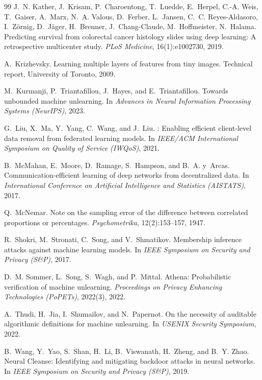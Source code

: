 \documentclass[11pt]{article}
\begin{document}
\begin{thebibliography}{99}
J.~N. Kather, J.~Krisam, P.~Charoentong, T.~Luedde, E.~Herpel, C.-A. Weis,
T.~Gaiser, A.~Marx, N.~A. Valous, D.~Ferber, L.~Jansen, C.~C. Reyes-Aldasoro,
I.~Z\"ornig, D.~J\"ager, H.~Brenner, J.~Chang-Claude, M.~Hoffmeister,
N.~Halama.
\newblock Predicting survival from colorectal cancer histology slides using
deep learning: A retrospective multicenter study.
\newblock \emph{PLoS Medicine}, 16(1):e1002730, 2019.

A.~Krizhevsky.
\newblock Learning multiple layers of features from tiny images.
\newblock Technical report, University of Toronto, 2009.

M.~Kurmanji, P.~Triantafillou, J.~Hayes, and E.~Triantafillou.
\newblock Towards unbounded machine unlearning.
\newblock In \emph{Advances in Neural Information Processing Systems
(NeurIPS)}, 2023.

G.~Liu, X.~Ma, Y.~Yang, C.~Wang, and J.~Liu.
: Enabling efficient client-level data removal from
federated learning models.
\newblock In \emph{IEEE/ACM International Symposium on Quality of Service
(IWQoS)}, 2021.

B.~McMahan, E.~Moore, D.~Ramage, S.~Hampson, and B.~A. y~Arcas.
\newblock Communication-efficient learning of deep networks from decentralized
data.
\newblock In \emph{International Conference on Artificial Intelligence and
Statistics (AISTATS)}, 2017.

Q.~McNemar.
\newblock Note on the sampling error of the difference between correlated
proportions or percentages.
\newblock \emph{Psychometrika}, 12(2):153--157, 1947.

R.~Shokri, M.~Stronati, C.~Song, and V.~Shmatikov.
\newblock Membership inference attacks against machine learning models.
\newblock In \emph{IEEE Symposium on Security and Privacy (S\&P)}, 2017.

D.~M. Sommer, L.~Song, S.~Wagh, and P.~Mittal.
\newblock Athena: Probabilistic verification of machine unlearning.
\newblock \emph{Proceedings on Privacy Enhancing Technologies (PoPETs)},
2022(3), 2022.

A.~Thudi, H.~Jia, I.~Shumailov, and N.~Papernot.
\newblock On the necessity of auditable algorithmic definitions for machine
unlearning.
\newblock In \emph{USENIX Security Symposium}, 2022.

B.~Wang, Y.~Yao, S.~Shan, H.~Li, B.~Viswanath, H.~Zheng, and B.~Y. Zhao.
\newblock Neural {C}leanse: Identifying and mitigating backdoor attacks in
neural networks.
\newblock In \emph{IEEE Symposium on Security and Privacy (S\&P)}, 2019.


\end{thebibliography}
\end{document}

